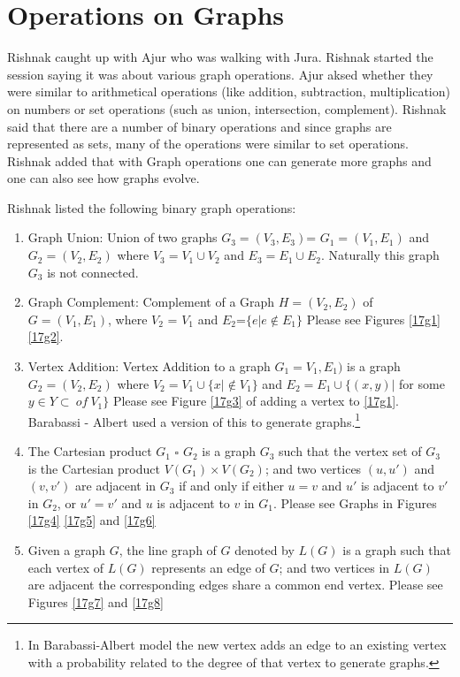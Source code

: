 \chapter{Operations on Graphs}

Rishnak caught up with Ajur who was walking with Jura. Rishnak started the session saying it was about various graph operations.
Ajur aksed whether they were similar to arithmetical operations (like addition, subtraction, multiplication) on numbers or set operations (such as union, intersection, complement). Rishnak said that there are a number of binary operations and since graphs are represented as sets, many of the operations were similar to set operations. Rishnak added that with Graph operations one can generate more graphs and one can also see how graphs evolve.

Rishnak listed the following binary graph operations:
\begin{enumerate}
    \item Graph Union: Union of two graphs $G_3=(V_3,E_3)$= $G_1=(V_1,E_1)$ and $G_2=(V_2,E_2)$ where $V_3= V_1 \cup V_2$ and
    $E_3=E_1\cup E_2$. Naturally this graph $G_3$ is not connected.
    \item Graph Complement: Complement of a Graph $H=(V_2,E_2)$ of $G=(V_1,E_1)$, where $V_2$ = $V_1$ and $E_2$=$\{e| e \notin E_1\}$ Please see Figures \ref{17g1} \ref{17g2}.
    \item Vertex Addition: Vertex Addition to a graph $G_1=V_1,E_1)$ is a graph $G_2=(V_2,E_2)$  where $V_2=V_1 \cup \{x| \notin V_1\}$ and $E_2=E_1 \cup \{(x,y)  |$ for some  $y  \in Y \subset~ of~ V_1\}$ Please see Figure \ref{17g3} of adding a vertex to \ref{17g1}. Barabassi - Albert used a version of this to generate graphs.\footnote {In Barabassi-Albert model the new vertex adds an edge to an existing vertex with a probability related to the degree of that vertex to generate graphs.}
    \item  The Cartesian product $G_1$ $ \square $  $G_2$ is a graph $G_3$ such that
the vertex set of $G_3$  is the Cartesian product $V(G_1) × V(G_2)$; and
two vertices $(u,u' )$ and $(v,v' )$ are adjacent in $G_3$ if and only if either
$u = v$ and $u'$ is adjacent to $v'$ in $G_2$, or
$u' = v'$ and $u$ is adjacent to $v$ in $G_1$. Please see Graphs in Figures \ref{17g4} \ref{17g5} and \ref{17g6}
\item Given a graph $G$, the line graph  of $G$ denoted by $L(G)$ is a graph such that
each vertex of $L(G)$ represents an edge of $G$; and
two vertices in $L(G)$ are adjacent the corresponding edges share a common end vertex. Please see Figures \ref{17g7} and \ref{17g8}
\end{enumerate}

